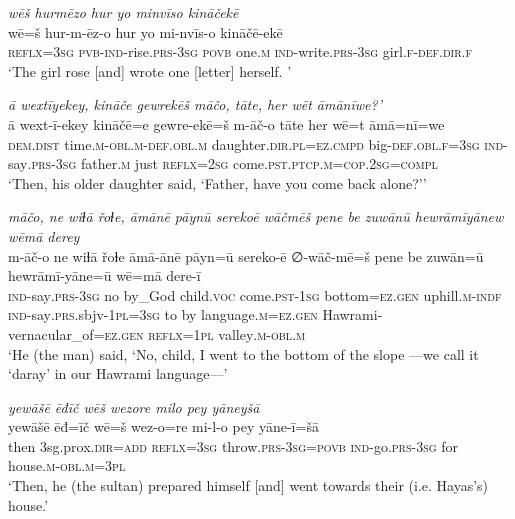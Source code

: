 \ea \label{KŠ.79}
\textit{wēš hurmēzo hur yo minvīso kināčekē} \\ 
\gll wē=š hur-m-ēz-o hur yo mi-nvīs-o kināčē-ekē \\ 
 \textsc{reflx}\textsc{=3sg} \textsc{pvb-}\textsc{ind-}rise\textsc{.prs}\textsc{-3sg} \textsc{povb} one\textsc{.m} \textsc{ind-}write\textsc{.prs}\textsc{-3sg} girl\textsc{.f}\textsc{-def}\textsc{.dir}\textsc{.f} \\ 
\glt `The girl rose [and] wrote one [letter] herself. '
\z 
 
\ea \label{ŽH.22}
\textit{ā wextīyekey, kināče gewrekēš māčo, tāte, her wēt āmānīwe?’} \\ 
\gll ā wext-ī-ekey kināčē=e gewre-ekē=š m-āč-o tāte her wē=t āmā=nī=we \\ 
 \textsc{dem.dist} time\textsc{.m}\textsc{-obl}\textsc{.m}\textsc{-def}\textsc{.obl}\textsc{.m} daughter\textsc{.dir}\textsc{.pl}\textsc{=ez}\textsc{.cmpd} big\textsc{-def}\textsc{.obl}\textsc{\textsc{.f}}\textsc{=3sg} \textsc{ind-}say\textsc{.prs}\textsc{-3sg} father\textsc{.m} just \textsc{reflx}\textsc{=\textsc{2sg}} come\textsc{.pst}\textsc{.ptcp}\textsc{.m}\textsc{=cop}\textsc{.\textsc{2sg}}\textsc{=compl} \\ 
\glt `Then, his older daughter said, ‘Father, have you come back alone?’'
\z 
 
\ea \label{ŽH.23}
\textit{māčo, ne wiɫā řoɫe, āmānē pāynū serekoē wāčmēš pene be zuwānū hewrāmīyānew wēmā derey} \\ 
\gll m-āč-o ne wiɫā řoɫe āmā-ānē pāyn=ū sereko-ē ∅-wāč-mē=š pene be zuwān=ū hewrāmī-yāne=ū wē=mā dere-ī \\ 
 \textsc{ind-}say\textsc{.prs}\textsc{-3sg} no by\_God child.\textsc{voc} come\textsc{.pst}\textsc{-1sg} bottom\textsc{=ez}\textsc{.gen} uphill\textsc{.m}\textsc{-indf} \textsc{ind-}say\textsc{.prs}.sbjv\textsc{-1pl}\textsc{=3sg} to by language\textsc{.m}\textsc{=ez}\textsc{.gen} Hawrami-vernacular\_of\textsc{=ez}\textsc{.gen} \textsc{reflx}\textsc{=1pl} valley\textsc{.m}\textsc{-obl}\textsc{.m} \\ 
\glt `He (the man) said, ‘No, child, I went to the bottom of the slope —we call it ‘daray’ in our Hawrami language—'
\z 
 
\ea \label{ŽH.72}
\textit{yewāšē ēđīč wēš wezore milo pey yāneyšā} \\ 
\gll yewāšē ēđ=īč wē=š wez-o=re mi-l-o pey yāne-ī=šā \\ 
 then 3sg.prox\textsc{.dir}\textsc{=add} \textsc{reflx}\textsc{=3sg} throw\textsc{.prs}\textsc{-3sg}\textsc{=\textsc{povb}} \textsc{ind-}go\textsc{.prs}\textsc{-3sg} for house\textsc{.m}\textsc{-obl}\textsc{.m}\textsc{=3pl} \\ 
\glt `Then, he (the sultan) prepared himself [and] went towards their (i.e. Hayas’s) house.'
\z 
 
